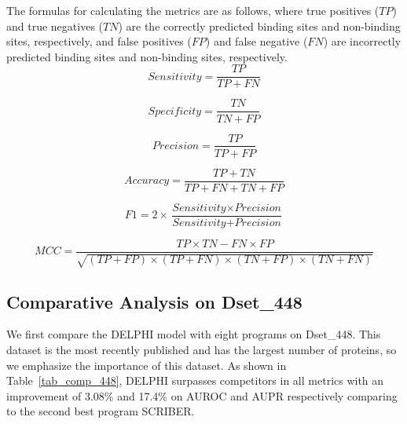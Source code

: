 The formulas for calculating the metrics are as follows, where true positives ($TP$) and true negatives ($TN$) are the correctly predicted binding sites and non-binding sites, respectively, and false positives ($FP$) and false negative ($FN$) are incorrectly predicted binding sites and non-binding sites, respectively.
\begin{equation}
\textit{Sensitivity} = \frac{TP}{TP+FN}
\end{equation}

\begin{equation}
\textit{Specificity} = \frac{TN}{TN+FP}
\end{equation}

\begin{equation}
\textit{Precision} = \frac{TP}{TP + FP} 
\end{equation}

\begin{equation}
\textit{Accuracy}=\frac{TP+TN}{TP+FN+TN+FP}
\end{equation}

\begin{equation}
F1=2\times \frac{\textit{Sensitivity}\times \textit{Precision}}{\textit{Sensitivity}+\textit{Precision}}
\end{equation}

\begin{equation}
MCC\!=\!\frac{TP \times TN - FN \times FP}{\sqrt{(TP\!+\!FP)\!\times\! (TP\!+\!FN)\! \times \!(TN\!+\!FP)\!\times\!(TN\!+\!FN)}}
\end{equation}
\subsection{Comparative Analysis on Dset\_448}
We first compare the DELPHI model with eight programs on Dset\_448. This dataset is the most recently published and has the largest number of proteins, so we emphasize the importance of this dataset. As shown in Table~\ref{tab_comp_448}, DELPHI surpasses competitors in all metrics with an improvement of 3.08\% and 17.4\% on AUROC and AUPR respectively comparing to the second best program SCRIBER.

